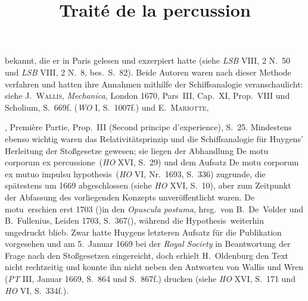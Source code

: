 \begin{ledgroup}
%
bekannt, die er in Paris gelesen und exzerpiert hatte
(siehe \cite{01292}\textit{LSB} VIII, 2 N.~50 und  \cite{01343}\textit{LSB} VIII, 2 N.~8, bes.\ S.~82).
%
Beide Autoren waren nach dieser Methode verfahren und hatten ihre Annahmen mithilfe der Schiffsanalogie veranschaulicht:
%
siehe \protect{}\textsc{J.~Wallis}, 
\cite{00301}\textit{Mechanica}, London 1670, Pars~III, Cap.~XI, Prop.~VIII und Scholium, S.~669f. (\cite{01008}\textit{WO} I, S.~1007f.) und
%
\protect{}%
\textsc{E.~Mariotte}, %
\cite{00311}\title{Traité de la percussion}, Première Partie, Prop.~III (Second principe d'experience), S.~25.
%
%
%
%
\pend
%
\pstart
Mindestens ebenso wichtig waren das Relativitätsprinzip und die Schiffsanalogie für Huygens' Herleitung der Stoßgesetze gewesen; 
%
sie liegen der Abhandlung \cite{00530}\glqq De motu corporum ex percussione\grqq\ (\textit{HO} XVI, S.~29)
%
und dem Aufsatz 
%
\cite{02037}\glqq De motu corporum ex mutuo impulsu hypothesis\grqq\ (\cite{00113}\textit{HO} VI, Nr.~1693, S.~336)
%
zugrunde, die spätestens um 1669 abgeschlossen (siehe \textit{HO} XVI, S.~10),
%
aber zum Zeitpunkt der Abfassung des vorliegenden Konzepts
%
unveröffentlicht waren.
%
\cite{00530}\glqq De motu\grqq\ erschien erst 1703
%
(\protect\vphantom)in den \cite{02076}\textit{Opuscula postuma}, 
%
hrsg.\ von \protect{}B.\ De~Volder 
%
und \protect{}B.~Fullenius, Leiden 1703, 
%
S.~367\protect\vphantom(),
%
während die \glqq Hypothesis\grqq\  weiterhin ungedruckt blieb.
%
Zwar hatte Huygens letzteren Aufsatz für die Publikation vorgesehen und
%
am 5.\ Januar 1669 bei der \textit{Royal Society} in Beantwortung der Frage nach den Stoßgesetzen eingereicht,
%
doch erhielt \protect{}H.~Oldenburg den Text
%
nicht rechtzeitig und konnte ihn nicht neben den Antworten von \protect{}\cite{01065}Wallis und \protect{}\cite{01066}Wren
%
(\cite{00158}\textit{PT} III, Januar 1669, S.~864 und S.~867f.)
%
drucken (siehe \textit{HO} XVI, S.~171 und \textit{HO} VI, S.~334f.).

\end{ledgroup}
